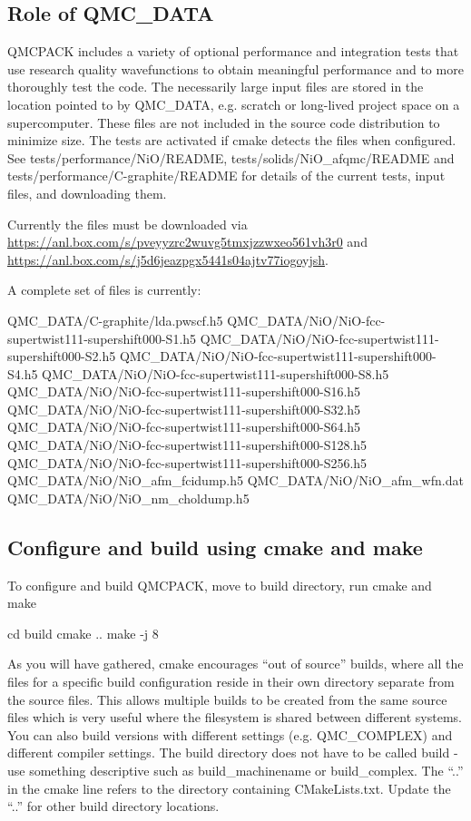 \subsection{Role of QMC\_DATA}
QMCPACK includes a variety of optional performance and integration
tests that use research quality wavefunctions to obtain meaningful
performance and to more thoroughly test the code. The necessarily
large input files are stored in the location pointed to by QMC\_DATA,
e.g. scratch or long-lived project space on a supercomputer. These
files are not included in the source code distribution to minimize
size. The tests are activated if cmake detects the files when
configured. See tests/performance/NiO/README,
tests/solids/NiO\_afqmc/README and tests/performance/C-graphite/README
for details of the current tests, input files, and downloading them.

Currently the files must be downloaded via\\
\url{https://anl.box.com/s/pveyyzrc2wuvg5tmxjzzwxeo561vh3r0} and \\
\url{https://anl.box.com/s/j5d6jeazpgx5441s04ajtv77iogoyjsh}.

A complete set of files is currently:
%
\begin{shade}
QMC_DATA/C-graphite/lda.pwscf.h5
QMC_DATA/NiO/NiO-fcc-supertwist111-supershift000-S1.h5
QMC_DATA/NiO/NiO-fcc-supertwist111-supershift000-S2.h5
QMC_DATA/NiO/NiO-fcc-supertwist111-supershift000-S4.h5
QMC_DATA/NiO/NiO-fcc-supertwist111-supershift000-S8.h5
QMC_DATA/NiO/NiO-fcc-supertwist111-supershift000-S16.h5
QMC_DATA/NiO/NiO-fcc-supertwist111-supershift000-S32.h5
QMC_DATA/NiO/NiO-fcc-supertwist111-supershift000-S64.h5
QMC_DATA/NiO/NiO-fcc-supertwist111-supershift000-S128.h5
QMC_DATA/NiO/NiO-fcc-supertwist111-supershift000-S256.h5
QMC_DATA/NiO/NiO_afm_fcidump.h5
QMC_DATA/NiO/NiO_afm_wfn.dat
QMC_DATA/NiO/NiO_nm_choldump.h5
\end{shade}


\subsection{Configure and build using cmake and make}
To configure and build QMCPACK, move to build directory, run cmake and make

\begin{shade}
cd build
cmake ..
make -j 8
\end{shade}

As you will have gathered, cmake encourages ``out of source'' builds,
where all the files for a specific build configuration reside in their
own directory separate from the source files. This allows multiple
builds to be created from the same source files which is very useful
where the filesystem is shared between different systems. You can also
build versions with different settings (e.g. QMC\_COMPLEX) and
different compiler settings. The build directory does not have to be
called build - use something descriptive such as build\_machinename or
build\_complex. The ``..'' in the cmake line refers to the directory
containing CMakeLists.txt. Update the ``..'' for other build
directory locations.

